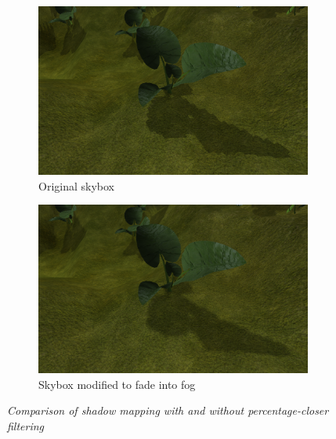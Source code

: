 \begin{figure}[H]
\begin{subfigure}{.5\textwidth}
  \centering
  \includegraphics[width=0.9\linewidth]{images/PCFLvl1.png}
  \caption{Original skybox}
  \label{fig:PCFLvl1}
\end{subfigure}%
\begin{subfigure}{.5\textwidth}
  \centering
  \includegraphics[width=0.9\linewidth]{images/PCFLvl5.png}
  \caption{Skybox modified to fade into fog}
  \label{fig:PCFLvl1}
\end{subfigure}
\caption[Noise comparison]{\textit{Comparison of shadow mapping with and without percentage-closer filtering}}
\label{fig:PCFComparison}
\end{figure}

